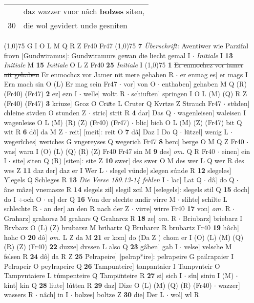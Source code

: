 \documentclass[8pt,a4paper,notitlepage]{article}
\begin{document}
\begin{table}[ht]
\begin{minipage}[t]{0.5\linewidth}
\begin{tabular}{rl}
 & daz wazzer vuor nâch \textbf{bolzes} siten,\\ 
30 & die wol gevidert unde gesniten\\ 
\end{tabular}
\scriptsize
\line(1,0){75} \newline
G I O L M Q R Z Fr40 Fr47 \newline
\line(1,0){75} \newline
\textbf{7} \textit{Überschrift:} Aventiwer wie Parzifal frovn [Gundwiramus]: Gundwiramurs gewan die liecht gemal I   $\cdot$ \textit{Initiale} I  \textbf{13} \textit{Initiale} M  \textbf{15} \textit{Initiale} O L Z Fr40  \textbf{25} \textit{Initiale} I  \newline
\line(1,0){75} \newline
\textbf{1} \sout{Er enmochcz vor iamer nit gehaben} Er enmochcz vor Jamer nit mere gehaben R  $\cdot$ er enmag es] er mags I Ern mach sin O (L) Er mag sein Fr47  $\cdot$ vor] von O  $\cdot$ enthaben] gehaben M Q (R) (Fr40) (Fr47) \textbf{2} ez] ezn I  $\cdot$ welle] woltt R  $\cdot$ schiuften] springen I O L (M) (Q) R Z (Fr40) (Fr47) \textbf{3} kriuze] Groz O Cruͯte L Cruter Q Kvrtze Z Strauch Fr47  $\cdot$ stûden] chleine stvden O stunden Z  $\cdot$ stric] strit R \textbf{4} dar] Das Q  $\cdot$ wagenleisen] waleisen I wagenleise O L (M) (R) (Z) (Fr40) (Fr47)  $\cdot$ blic] bich O L (M) (Z) (Fr47) bit Q wit R \textbf{6} dô] da M Z  $\cdot$ reit] [meit]: reit O \textbf{7} dâ] Daz I Do Q  $\cdot$ lützel] wenig L  $\cdot$ wegerîches] weriches G vngereyses Q wegerich Fr47 \textbf{8} berc] berge O M Q Z Fr40  $\cdot$ was] warn I (O) (L) (Q) (R) (Z) Fr40 Fr47 sin M \textbf{9} des] \textit{om.} Q R Fr40  $\cdot$ einen] ein I  $\cdot$ site] siten Q (R) [siten]: site  Z \textbf{10} swer] des swer O M des wer L Q wer R des wes Z \textbf{11} daz der] daz er I Wer L  $\cdot$ slegel vünde] slegen súnde R \textbf{12} slegeles] Ylegels Q Schleges R \textbf{13} \textit{Die Verse 180.13-14 fehlen} I   $\cdot$ lac] Lat Q  $\cdot$ dâ] do Q  $\cdot$ âne mâze] vnemasze R \textbf{14} slegels zil] slegil zcil M [selegels]: slegels stil Q \textbf{15} doch] do I ÷och O  $\cdot$ er] der Q \textbf{16} Von der slechte andir virre M  $\cdot$ slihte] schilte L schlechte R  $\cdot$ an der] an den R nach der Z  $\cdot$ virre] wirre Fr40 \textbf{17} von] \textit{om.} R  $\cdot$ Graharz] grahorsz M grahars Q Graharcz R \textbf{18} ze] \textit{om.} R  $\cdot$ Briubarz] briebarz I Brvbarz O (L) (Z) brubarsz M bribartz Q Brubarcz R brubartz Fr40 \textbf{19} hôch] hohc O \textbf{20} dô] \textit{om.} L Z da M \textbf{21} er kom] do (Da Z ) chom er I (O) (L) (M) (Q) (R) (Z) (Fr40) \textbf{22} duzze] dvssen L also Q \textbf{23} gâben] gab I  $\cdot$ velse] velsche M felsen R \textbf{24} dô] da R Z \textbf{25} Pelrapeire] [pelrap*ire]: pelrapeire G pailrapaier I Pelrapeir O peylrapeire Q \textbf{26} Tampunteire] tanpantaier I Tampvnteir O Tampvntaiere L túmpenteire Q Tampuͦnteire R \textbf{27} si] sich I  $\cdot$ sîn] siniu I (M)  $\cdot$ kint] kin Q \textbf{28} liute] lútten R \textbf{29} daz] Dize O (L) (M) (Q) (R) (Fr40)  $\cdot$ wazzer] wassers R  $\cdot$ nâch] in I  $\cdot$ bolzes] boltze Z \textbf{30} die] Der L  $\cdot$ wol] wl R \newline

\end{minipage}
\end{table}
\end{document}
